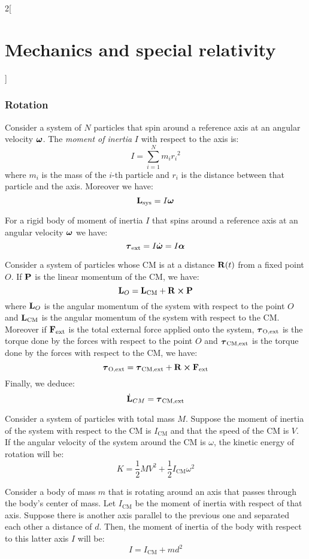 \documentclass[../../../main.tex]{subfiles}
\begin{document}
\begin{multicols}{2}[\section{Mechanics and special relativity}]
  \subsubsection{Rotation}
  \begin{definition}
    Consider a system of $N$ particles that spin around a reference axis at an angular velocity $\boldsymbol{\mathrm{\omega}}$. The \textit{moment of inertia} $I$ with respect to the axis is: $$I=\sum_{i=1}^Nm_i{r_i}^2$$
    where $m_i$ is the mass of the $i$-th particle and $r_i$ is the distance between that particle and the axis. Moreover we have: $$\boldsymbol{\mathrm{L}}_\text{sys}=I\boldsymbol{\mathrm{\omega}}$$
  \end{definition}
  \begin{prop}
    For a rigid body of moment of inertia $I$ that spins around a reference axis at an angular velocity $\boldsymbol{\mathrm{\omega}}$ we have: $$\boldsymbol{\mathrm{\tau}}_\text{ext}=I\dot{\boldsymbol{\mathrm{\omega}}}=I\boldsymbol{\mathrm{\alpha}}$$
  \end{prop}
  \begin{prop}
    Consider a system of particles whose CM is at a distance $\boldsymbol{\mathrm{R}}(t)$ from a fixed point $O$. If $\boldsymbol{\mathrm{P}}$ is the linear momentum of the CM, we have: $$\vectorfunction{L}_O=\vectorfunction{L}_\text{CM}+\vectorfunction{R}\crossprod\vectorfunction{P}$$ where $\boldsymbol{\mathrm{L}}_O$ is the angular momentum of the system with respect to the point $O$ and $\boldsymbol{\mathrm{L}}_\text{CM}$ is the angular momentum of the system with respect to the CM. Moreover if $\boldsymbol{\mathrm{F}}_\text{ext}$ is the total external force applied onto the system, $\boldsymbol{\mathrm{\tau}}_\text{O,ext}$ is the torque done by the forces with respect to the point $O$ and $\boldsymbol{\mathrm{\tau}}_\text{CM,ext}$ is the torque done by the forces with respect to the CM, we have: $$\vectorfunction{\tau}_\text{O,ext}=\vectorfunction{\tau}_\text{CM,ext}+\vectorfunction{R}\crossprod\vectorfunction{F}_\text{ext}$$ Finally, we deduce: $$\dot{\boldsymbol{\mathrm{L}}}_{CM}=\boldsymbol{\mathrm{\tau}}_\text{CM,ext}$$
  \end{prop}
  \begin{prop}
    Consider a system of particles with total mass $M$. Suppose the moment of inertia of the system with respect to the CM is $I_\text{CM}$ and that the speed of the CM is $V$. If the angular velocity of the system around the CM is $\omega$, the kinetic energy of rotation will be: $$K=\frac{1}{2}MV^2+\frac{1}{2}I_\text{CM}\omega^2$$
  \end{prop}
  \begin{theorem}
    Consider a body of mass $m$ that is rotating around an axis that passes through the body's center of mass. Let $I_\text{CM}$ be the moment of inertia with respect of that axis. Suppose there is another axis parallel to the previous one and separated each other a distance of $d$. Then, the moment of inertia of the body with respect to this latter axis $I$ will be:
    $$I=I_\text{CM}+md^2$$
  \end{theorem}

\end{multicols}
\end{document}
